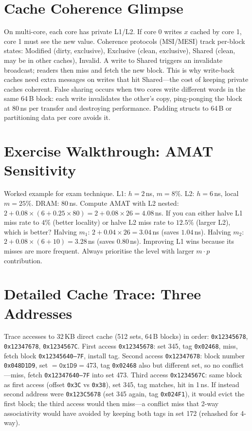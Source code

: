 \section{Cache Coherence Glimpse}
On multi-core, each core has private L1/L2. If core 0 writes $x$ cached by core 1, core 1 must see the new value. Coherence protocols (MSI/MESI) track per-block states: Modified (dirty, exclusive), Exclusive (clean, exclusive), Shared (clean, may be in other caches), Invalid. A write to Shared triggers an invalidate broadcast; readers then miss and fetch the new block. This is why write-back caches need extra messages on writes that hit Shared---the cost of keeping private caches coherent. False sharing occurs when two cores write different words in the same 64\,B block: each write invalidates the other's copy, ping-ponging the block at 80\,ns per transfer and destroying performance. Padding structs to 64\,B or partitioning data per core avoids it.

\section{Exercise Walkthrough: AMAT Sensitivity}
Worked example for exam technique. L1: $h=2$\,ns, $m=8\%$. L2: $h=6$\,ns, local $m=25\%$. DRAM: $80$\,ns. Compute AMAT with L2 nested: $2+0.08\times(6+0.25\times80)=2+0.08\times26=4.08$\,ns. If you can either halve L1 miss rate to $4\%$ (better locality) or halve L2 miss rate to $12.5\%$ (larger L2), which is better? Halving $m_1$: $2+0.04\times26=3.04$\,ns (saves $1.04$\,ns). Halving $m_2$: $2+0.08\times(6+10)=3.28$\,ns (saves $0.80$\,ns). Improving L1 wins because its misses are more frequent. Always prioritise the level with larger $m\cdot p$ contribution.

\section{Detailed Cache Trace: Three Addresses}
Trace accesses to 32\,KB direct cache (512 sets, 64\,B blocks) in order: \texttt{0x12345678}, \texttt{0x12347678}, \texttt{0x1234567C}.
First access \texttt{0x12345678}: set 345, tag \texttt{0x02468}, miss, fetch block \texttt{0x12345640--7F}, install tag.
Second access \texttt{0x12347678}: block number \texttt{0x048D1D9}, set $= \texttt{0x1D9}=473$, tag \texttt{0x02468} also but different set, so no conflict---miss, fetch \texttt{0x12347640--7F} into set 473.
Third access \texttt{0x1234567C}: same block as first access (offset \texttt{0x3C} vs \texttt{0x38}), set 345, tag matches, hit in 1\,ns.
If instead second address were \texttt{0x123C5678} (set 345 again, tag \texttt{0x024F1}), it would evict the first block; the third access would then miss---a conflict miss that 2-way associativity would have avoided by keeping both tags in set 172 (rehashed for 4-way).

